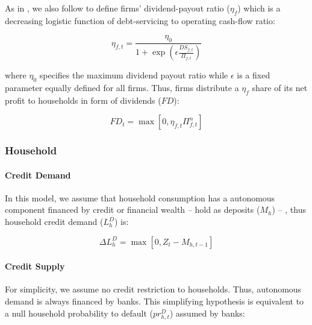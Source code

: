 \documentclass{SelfArx}
\begin{document}
As in \textcite{pedrosa_2021_What}, we also follow \textcite{reissl_2020_Minsky} to define firms' dividend-payout ratio (\(\eta_{f}\)) which is a decreasing logistic function of debt-servicing to operating cash-flow ratio:
\begin{latex}
\begin{equation}
\eta_{f,t} = \frac{\eta_{0}}{1+\exp\left(\epsilon\frac{DS_{f,t}}{\Pi_{f,t}}\right)}
\end{equation}
\end{latex}
where \(\eta_{0}\) specifies the maximum dividend payout ratio while \(\epsilon\) is a fixed parameter equally defined for all firms.
Thus, firms distribute a \(\eta_{f}\) share of its net profit to households in form of dividends (\(FD\)):
\begin{latex}
\begin{equation}
FD_{t} = \max [0,\eta_{f,t}\Pi_{f,t}^{n}]
\end{equation}
\end{latex}

\subsubsection{Household}
\label{sec:orgb70dc65}

\paragraph*{Credit Demand}
\label{sec:org46be8bb}

In this model, we assume that household consumption has a autonomous component financed by credit or financial wealth -- hold as deposits (\(M_{h}\)) -- , thus household credit demand (\(L^{D}_{h}\)) is:

\begin{latex}
\begin{equation}
\Delta L^{D}_{h} = \max [0, Z_{t} - M_{h,t-1}]
\end{equation}
\end{latex}

\paragraph*{Credit Supply}
\label{sec:org175401c}

For simplicity, we assume no credit restriction to households.
Thus, autonomous demand is always financed by banks.
This simplifying hypothesis is equivalent to a null household probability to default (\(pr^{D}_{h,t}\)) assumed by banks:
\end{document}
